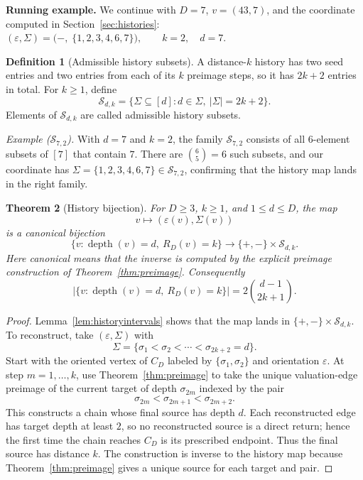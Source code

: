 \documentclass[11pt]{amsart}
\newtheorem{theorem}{Theorem}[section]
\theoremstyle{definition}
\newtheorem{definition}[theorem]{Definition}
\theoremstyle{remark}
\newcommand{\depth}{\operatorname{depth}}
\newcommand{\Sfam}{\mathcal S}
\newcommand{\eps}{\varepsilon}
\begin{document}
\textbf{Running example.}
We continue with $D=7$, $v=(43,7)$, and the coordinate computed in
Section~\ref{sec:histories}:
\(
  (\eps,\Sigma)=\bigl(-,\;\{1,2,3,4,6,7\}\bigr),\qquad k=2,\quad d=7.
\)

\begin{definition}[Admissible history subsets]\label{def:Sfam}
A distance-$k$ history has two seed entries and two entries from each
of its \(k\) preimage steps, so it has \(2k+2\) entries in total.  For
\(k\ge1\), define
\[
\Sfam_{d,k}
=
\{\Sigma\subseteq[d]:d\in\Sigma,\ |\Sigma|=2k+2\}.
\]
Elements of \(\Sfam_{d,k}\) are called admissible history subsets.
\end{definition}

\textit{Example ($\Sfam_{7,2}$).}
With $d=7$ and $k=2$, the family $\Sfam_{7,2}$ consists of all
$6$-element subsets of $[7]$ that contain $7$.  There are
$\binom{6}{5}=6$ such subsets, and our coordinate has
$\Sigma=\{1,2,3,4,6,7\}\in\Sfam_{7,2}$, confirming that the history
map lands in the right family.

\begin{theorem}[History bijection]\label{thm:bijection}
For $D\ge3$, $k\ge1$, and $1\le d\le D$, the map
\[
v\longmapsto (\eps(v),\Sigma(v))
\]
is a canonical bijection
\[
\{v:\depth(v)=d,\ R_D(v)=k\}
\longrightarrow
\{+,-\}\times\Sfam_{d,k}.
\]
Here canonical means that the inverse is computed by the explicit
preimage construction of Theorem~\ref{thm:preimage}.  Consequently
\[
\bigl|\{v:\depth(v)=d,\ R_D(v)=k\}\bigr|=2\binom{d-1}{2k+1}.
\]
\end{theorem}
\begin{proof}
Lemma~\ref{lem:historyintervals} shows that the map lands in
$\{+,-\}\times\Sfam_{d,k}$.
To reconstruct, take $(\eps,\Sigma)$ with
\[
\Sigma=\{\sigma_1<\sigma_2<\cdots<\sigma_{2k+2}=d\}.
\]
Start with the oriented vertex of $C_D$ labeled by
$\{\sigma_1,\sigma_2\}$ and orientation $\eps$.  At step
$m=1,\ldots,k$, use Theorem~\ref{thm:preimage} to take the unique
valuation-edge preimage of the current target of depth $\sigma_{2m}$
indexed by the pair
\[
\sigma_{2m}<\sigma_{2m+1}<\sigma_{2m+2}.
\]
This constructs a chain whose final source has depth $d$.
Each reconstructed edge has target depth at least $2$, so no
reconstructed source is a direct return; hence the first time the
chain reaches $C_D$ is its prescribed endpoint.  Thus the final source
has distance $k$.  The construction is inverse to the history map
because Theorem~\ref{thm:preimage} gives a unique source for each
target and pair.
\end{proof}
\end{document}
